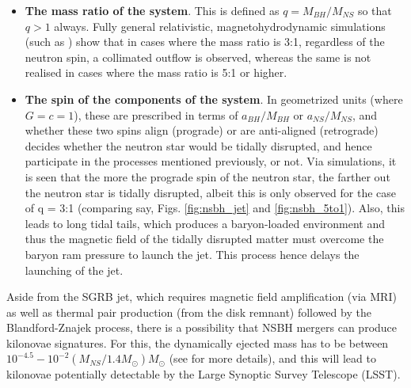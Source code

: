     \begin{itemize}

        \item \textbf{The mass ratio of the system}. This is defined as $q = M_{BH} /
            M_{NS}$ so that $q > 1$ always. Fully general relativistic,
            magnetohydrodynamic simulations (such as \cite{ruiz_2020}) show that in
            cases where the  mass ratio is 3:1, regardless of the neutron spin, a
            collimated outflow is observed, whereas the same is not realised in cases
            where the mass ratio is 5:1 or higher.

        \item \textbf{The spin of the components of the system}. In geometrized units
            (where $G = c = 1$), these are prescribed in terms of $a_{BH} / M_{BH}$ or
            $a_{NS} / M_{NS}$, and whether these two spins align (prograde) or are
            anti-aligned (retrograde) decides whether the neutron star would be tidally
            disrupted, and hence participate in the processes mentioned previously, or
            not. Via simulations, it is seen that the more the prograde spin of the
            neutron star, the farther out the neutron star is tidally disrupted, albeit
            this is only observed for the case of q = 3:1 (comparing say, Figs.
            \ref{fig:nsbh_jet} and \ref{fig:nsbh_5to1}). Also, this leads to long tidal
            tails, which produces a baryon-loaded environment and thus the magnetic
            field of the tidally disrupted matter must overcome the baryon ram pressure
            to launch the jet. This process hence delays the launching of the jet.

    \end{itemize}

    Aside from the SGRB jet, which requires magnetic field amplification (via MRI) as
    well as thermal pair production (from the disk remnant) followed by the
    Blandford-Znajek process, there is a possibility that NSBH mergers can produce
    kilonovae signatures. For this, the dynamically ejected mass has to be between
    $10^{-4.5} - 10^{-2} (M_{NS}/1.4 M_{\odot}) M_{\odot}$ (see \cite{ruiz_2020} for
    more details), and this will lead to kilonovae potentially detectable by the Large
    Synoptic Survey Telescope (LSST).

